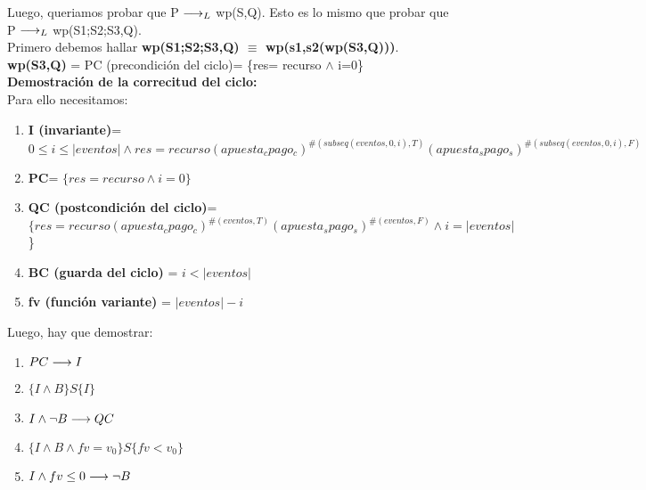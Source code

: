 \documentclass[10pt,a4paper]{article}
\begin{document}
\begin{flushleft}
\vspace{3mm}
Luego, queriamos probar que P $\longrightarrow _L$ wp(S,Q). Esto es lo mismo que probar que P $\longrightarrow _L$ wp(S1;S2;S3,Q).\\
\vspace{3mm}
Primero debemos hallar \textbf{wp(S1;S2;S3,Q) $\equiv$ wp(s1,s2(wp(S3,Q)))}.\\
\vspace{3mm}
\textbf{wp(S3,Q)} = PC (precondición del ciclo)= \{res= recurso $\wedge$ i=0\}\\
\vspace{3mm}
\textbf{Demostración de la correcitud del ciclo:}\\
\vspace{3mm}
Para ello necesitamos: 
\begin{enumerate} \setlength\itemsep{0cm}
	\item \textbf{I (invariante)}= $0\leq i \leq |eventos| \wedge res=recurso(apuesta_cpago_c)^{\#(subseq(eventos,0,i),T)}(apuesta_spago_s)^{\#(subseq(eventos,0,i),F)}$
	\item \textbf{PC}= $\{res= recurso \wedge i=0\}$
	\item \textbf{QC (postcondición del ciclo)}= $\{res=recurso(apuesta_cpago_c)^{\#(eventos,T)}(apuesta_spago_s)^{\#(eventos,F)} \wedge i=|eventos|$\}
	\item \textbf{BC (guarda del ciclo)} = $i < |eventos|$
	\item \textbf{fv (función variante)} = $|eventos|-i$
\end{enumerate}

Luego, hay que demostrar:
\begin{enumerate} \setlength\itemsep{0cm}
	\item \textbf{$PC \longrightarrow I$}
	\item \textbf{$\{ I \wedge B \}S\{ I \}$}
	\item \textbf{$I \wedge \neg B \longrightarrow QC$}
	\item \textbf{$\{ I \wedge B \wedge fv= v_0 \}S\{ fv<v_0 \}$}
	\item \textbf{$I \wedge fv\leq0 \longrightarrow \neg B$} 

\end{enumerate}


\end{flushleft}
\end{document}
